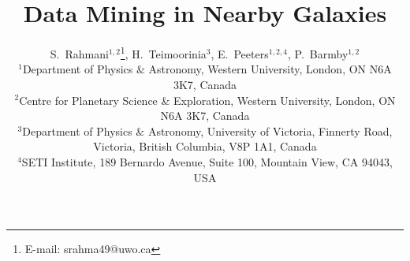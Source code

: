 \documentclass[useAMS,usenatbib]{mn2e}
\begin{document}
\title{Data Mining in Nearby Galaxies}
\author[S. Rahmani, et. al.]{S.~Rahmani$^{1, 2}$\thanks{E-mail:
srahma49@uwo.ca}, H.~Teimoorinia$^{3}$, E.~Peeters$^{1, 2, 4}$, P.~Barmby$^{1, 2}$\\
$^{1}$Department of Physics $\&$ Astronomy, Western University, London, ON N6A 3K7, Canada\\
$^{2}$Centre for Planetary Science \& Exploration, Western University, London, ON N6A 3K7, Canada\\
$^{3}$Department of Physics $\&$ Astronomy, University of Victoria, Finnerty Road, Victoria, British Columbia, V8P 1A1, Canada\\
$^{4}$SETI Institute, 189 Bernardo Avenue, Suite 100, Mountain View, CA 94043, USA}
\maketitle

\end{document}
